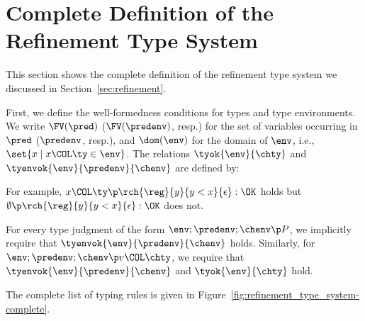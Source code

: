 \section{Complete Definition of the Refinement Type System}
\label{sec:refinement-apx}
This section shows the complete definition of the refinement type system we discussed in Section~\ref{sec:refinement}.

First, we define the well-formedness conditions for types and type environments.
We write \(\FV(\pred)\) (\(\FV(\predenv)\), resp.)
for the set of variables occurring in \(\pred\) (\(\predenv\), resp.),
and \(\dom(\env)\) for the domain of \(\env\), i.e.,
\(\set{x \mid x\COL\ty\in\env}\).
The relations \(\tyok{\env}{\chty}\)
and \(\tyenvok{\env}{\predenv}{\chenv}\)
are defined by:

{}

{\tyenvok{\env}{\predenv}{\chenv}}
  For example, \(x\COL \ty \p \rch{\reg}{y}{y<x}{\epsilon}:\OK\)
  holds but
  \(\emptyset \p \rch{\reg}{y}{y<x}{\epsilon}:\OK\) does not.

For every type judgment of the form \(\env;\predenv;\chenv \p P\),
we implicitly require that \(\tyenvok{\env}{\predenv}{\chenv}\) holds.
Similarly,  for $\env;\predenv;\chenv \p v\COL\chty$,
we require
that \(\tyenvok{\env}{\predenv}{\chenv}\) and \(\tyok{\env}{\chty}\) hold.

The complete list of typing rules is given in Figure~\ref{fig:refinement_type_system-complete}.

